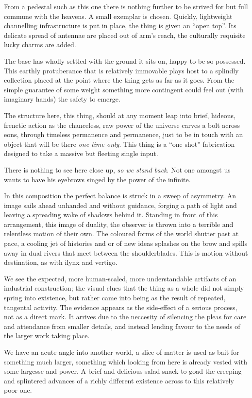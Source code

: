 \documentclass{book}
\begin{document}
From a pedestal such as this one there is nothing further to be strived for but
full commune with the heavens. A small exemplar is chosen. Quickly, lightweight
channelling infrastructure is put in place, the thing is given an ``open top''.
Its delicate spread of antennae are placed out of arm's reach, the culturally
requisite lucky charms are added.

The base has wholly settled with the ground it sits on, happy to be so
possessed. This earthly protuberance that is relatively immovable plays host to
a splindly collection placed at the point where the thing gets as far as it
goes. From the simple guarantee of some weight something more contingent could
feel out (with imaginary hands) the safety to emerge.

The structure here, this thing, should at any moment leap into brief, hideous,
frenetic action as the chanceless, raw power of the universe carves a bolt
across eons, through timeless permanence and permanence, just to be in touch
with an object that will be there \emph{one time only}. This thing is a ``one
shot'' fabrication designed to take a massive but fleeting single input.

There is nothing to see here close up, \emph{so we stand back}. Not one amongst
us wants to have his eyebrows singed by the power of the infinite.

In this composition the perfect balance is struck in a sweep of asymmetry. An
image sails ahead unhanded and without guidance, forging a path of light and
leaving a spreading wake of shadows behind it. Standing in front of this
arrangement, this image of duality, the observer is thrown into a terrible and
relentless motion of their own. The coloured forms of the world shutter past at
pace, a cooling jet of histories and or of new ideas splashes on the brow and
spills away in dual rivers that meet between the shoulderblades. This is motion
without destination, as with ilynx and vertigo.

We see the expected, more human-scaled, more understandable artifacts of an
industrial construction; the visual clues that the thing as a whole did not
simply spring into existence, but rather came into being as the result of
repeated, tangental activity. The evidence appears as the side-effect of a
serious process, not as a direct mark. It arrives due to the neccesity of
silencing the pleas for care and attendance from smaller details, and instead
lending favour to the needs of the larger work taking place.

We have an acute angle into another world, a slice of matter is used as bait
for something much larger, something which looking from here is already vested
with some largesse and power. A brief and delicious salad snack to goad the
creeping and splintered advances of a richly different existence across to this
relatively poor one.
\end{document}
